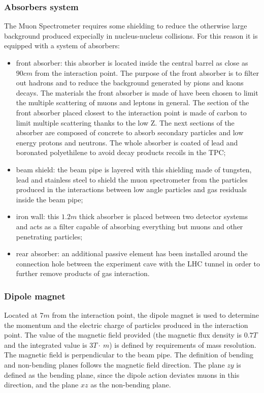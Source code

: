 \subsubsection{Absorbers system}
The Muon Spectrometer requires some shielding to reduce the otherwise large background produced expecially in nucleus-nucleus collisions.
For this reason it is equipped with a system of absorbers:
\begin{itemize}
    \item front absorber: this absorber is located inside the central barrel as close as $90 cm$ from the interaction point. The purpose of the front absorber is to filter out hadrons and to reduce the background generated by pions and kaons decays. The materials the front absorber is made of have been chosen to limit the multiple scattering of muons and leptons in general. The section of the front absorber placed closest to the interaction point is made of carbon to limit multiple scattering thanks to the low Z. The next sections of the absorber are composed of concrete to absorb secondary particles and low energy protons and neutrons. The whole absorber is coated of lead and boronated polyethilene to avoid decay products recoils in the TPC;
    \item beam shield: the beam pipe is layered with this shielding made of tungsten, lead and stainless steel to shield the muon spectrometer from the particles produced in the interactions between low angle particles and gas residuals inside the beam pipe;
    \item iron wall: this $1.2m$ thick absorber is placed between two detector systems and acts as a filter capable of absorbing everything but muons and other penetrating particles;
    \item rear absorber: an additional passive element has been installed around the connection hole between the experiment cave with the LHC tunnel in order to further remove products of gas interaction.
\end{itemize}

\subsubsection{Dipole magnet}
Located at $7m$ from the interaction point, the dipole magnet is used to determine the momentum and the electric charge of particles produced in the interaction point.
The value of the magnetic field provided (the magnetic flux density is $0.7T$ and the integrated value is $3T\cdot~m$) is defined by requirements of mass resolution.
The magnetic field is perpendicular to the beam pipe.
The definition of bending and non-bending planes follows the magnetic field direction.
The plane $zy$ is defined as the bending plane, since the dipole action deviates muons in this direction, and the plane $xz$ as the non-bending plane.

